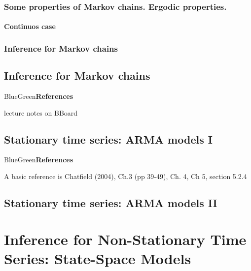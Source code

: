 \documentclass[dvipsnames,12pt]{book}
\begin{document}
        \section{Some properties of Markov chains. Ergodic properties.}

            \subsection{Continuos case}

        \section{Inference for Markov chains}

    \chapter{Inference for Markov chains}

            \begin{mybox}{BlueGreen}{\textbf{References}}

                lecture notes on BBoard
                
            \end{mybox}

    \chapter{Stationary time series: ARMA models I}

            \begin{mybox}{BlueGreen}{\textbf{References}}

                A basic reference is Chatfield (2004), Ch.3 (pp 39-49), Ch. 4, Ch 5, section 5.2.4
                
            \end{mybox}

        

    \chapter{Stationary time series: ARMA models II}
    
\part[Inference for Non-Stationary Time Series]{Inference for Non-Stationary Time Series: State-Space Models}
\end{document}
